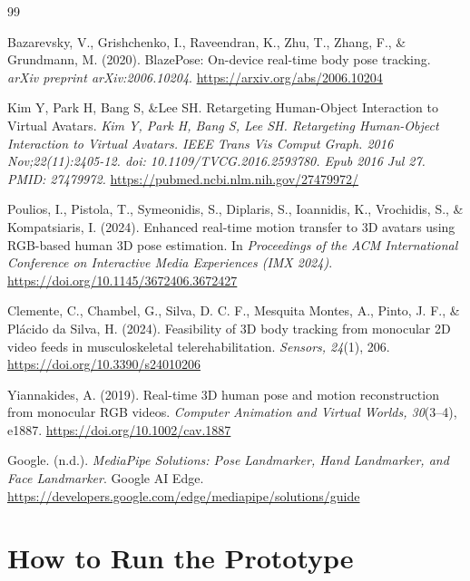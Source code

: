 \documentclass[12pt,a4paper]{article}
\begin{document}
\newpage
\begin{thebibliography}{99}

Bazarevsky, V., Grishchenko, I., Raveendran, K., Zhu, T., Zhang, F., \& Grundmann, M. (2020).
BlazePose: On-device real-time body pose tracking.
\textit{arXiv preprint arXiv:2006.10204}.
\url{https://arxiv.org/abs/2006.10204}

Kim Y, Park H, Bang S, \&Lee SH. Retargeting Human-Object Interaction to Virtual Avatars.
\textit{Kim Y, Park H, Bang S, Lee SH. Retargeting Human-Object Interaction to Virtual Avatars. IEEE Trans Vis Comput Graph. 2016 Nov;22(11):2405-12. doi: 10.1109/TVCG.2016.2593780. Epub 2016 Jul 27. PMID: 27479972.}
\url{https://pubmed.ncbi.nlm.nih.gov/27479972/}

Poulios, I., Pistola, T., Symeonidis, S., Diplaris, S., Ioannidis, K., Vrochidis, S., \& Kompatsiaris, I. (2024).
Enhanced real-time motion transfer to 3D avatars using RGB-based human 3D pose estimation.
In \textit{Proceedings of the ACM International Conference on Interactive Media Experiences (IMX 2024)}.
\url{https://doi.org/10.1145/3672406.3672427}

Clemente, C., Chambel, G., Silva, D. C. F., Mesquita Montes, A., Pinto, J. F., \& Pl\'acido da Silva, H. (2024).
Feasibility of 3D body tracking from monocular 2D video feeds in musculoskeletal telerehabilitation.
\textit{Sensors, 24}(1), 206.
\url{https://doi.org/10.3390/s24010206}

Yiannakides, A. (2019).
Real-time 3D human pose and motion reconstruction from monocular RGB videos.
\textit{Computer Animation and Virtual Worlds, 30}(3--4), e1887.
\url{https://doi.org/10.1002/cav.1887}

Google. (n.d.). \textit{MediaPipe Solutions: Pose Landmarker, Hand Landmarker, and Face Landmarker}.
Google AI Edge.
\url{https://developers.google.com/edge/mediapipe/solutions/guide}

\end{thebibliography}

\newpage
\appendix
\section{How to Run the Prototype}
\end{document}
